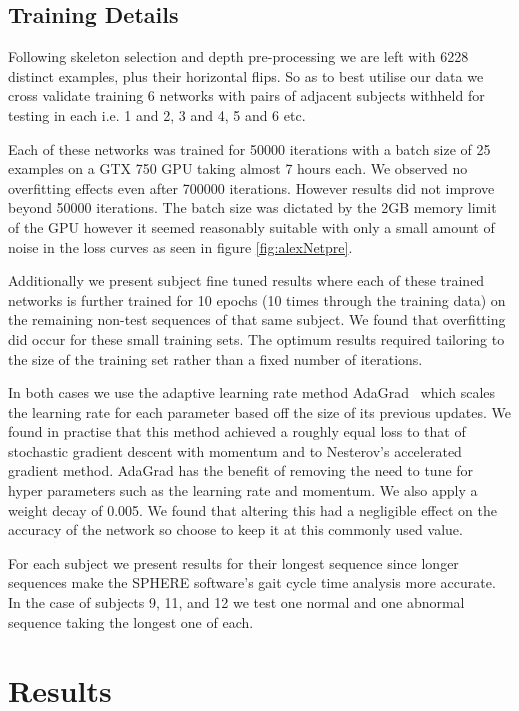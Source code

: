 \documentclass[11pt]{article} %
\begin{document}
\subsection{Training Details}


Following skeleton selection and depth pre-processing we are left with 6228 distinct examples, plus their horizontal flips. So as to best utilise our data we cross validate training 6 networks with pairs of adjacent subjects withheld for testing in each i.e. 1 and 2, 3 and 4, 5 and 6 etc. 

Each of these networks was trained for 50000 iterations with a batch size of 25 examples on a GTX 750 GPU taking almost 7 hours each. We observed no overfitting effects even after 700000 iterations. However results did not improve beyond 50000 iterations. The batch size was dictated by the 2GB memory limit of the GPU however it seemed reasonably suitable with only a small amount of noise in the loss curves as seen in figure \ref{fig:alexNetpre}.

Additionally we present subject fine tuned results where each of these trained networks is further trained for 10 epochs (10 times through the training data) on the remaining non-test sequences of that same subject. We found that overfitting did occur for these small training sets. The optimum results required tailoring to the size of the training set rather than a fixed number of iterations. 

In both cases we use the adaptive learning rate method AdaGrad~\cite{Duchi2011} which scales the learning rate for each parameter based off the size of its previous updates. We found in practise that this method achieved a roughly equal loss to that of stochastic gradient descent with momentum and to Nesterov's accelerated gradient method. AdaGrad has the benefit of removing the need to tune for hyper parameters such as the learning rate and momentum. We also apply a weight decay of 0.005. We found that altering this had a negligible effect on the accuracy of the network so choose to keep it at this commonly used value.

For each subject we present results for their longest sequence since longer sequences make the SPHERE software's gait cycle time analysis more accurate. In the case of subjects 9, 11, and 12 we test one normal and one abnormal sequence taking the longest one of each. 

\section{Results}
\end{document}
